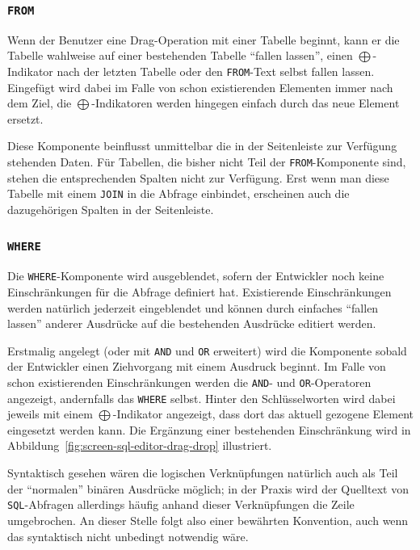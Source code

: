 \subsubsection{\texttt{FROM}}

Wenn der Benutzer eine Drag-Operation mit einer Tabelle beginnt, kann er die Tabelle wahlweise auf einer bestehenden Tabelle "`fallen lassen"', einen $\bigoplus$-Indikator nach der letzten Tabelle oder den \texttt{FROM}-Text selbst fallen lassen. Eingefügt wird dabei im Falle von schon existierenden Elementen immer nach dem Ziel, die $\bigoplus$-Indikatoren werden hingegen einfach durch das neue Element ersetzt.

Diese Komponente beinflusst unmittelbar die in der Seitenleiste zur Verfügung stehenden Daten. Für Tabellen, die bisher nicht Teil der \texttt{FROM}-Komponente sind, stehen die entsprechenden Spalten nicht zur Verfügung. Erst wenn man diese Tabelle mit einem \texttt{JOIN} in die Abfrage einbindet, erscheinen auch die dazugehörigen Spalten in der Seitenleiste.

\subsubsection{\texttt{WHERE}}

Die \texttt{WHERE}-Komponente wird ausgeblendet, sofern der Entwickler noch keine Einschränkungen für die Abfrage definiert hat. Existierende Einschränkungen werden natürlich jederzeit eingeblendet und können durch einfaches "`fallen lassen"' anderer Ausdrücke auf die bestehenden Ausdrücke editiert werden.

Erstmalig angelegt (oder mit \texttt{AND} und \texttt{OR} erweitert) wird die Komponente sobald der Entwickler einen Ziehvorgang mit einem Ausdruck beginnt. Im Falle von schon existierenden Einschränkungen werden die \texttt{AND}- und \texttt{OR}-Operatoren angezeigt, andernfalls das \texttt{WHERE} selbst. Hinter den Schlüsselworten wird dabei jeweils mit einem $\bigoplus$-Indikator angezeigt, dass dort das aktuell gezogene Element eingesetzt werden kann. Die Ergänzung einer bestehenden Einschränkung wird in Abbildung~\ref{fig:screen-sql-editor-drag-drop} illustriert.

Syntaktisch gesehen wären die logischen Verknüpfungen natürlich auch als Teil der "`normalen"' binären Ausdrücke möglich; in der Praxis wird der Quelltext von \texttt{SQL}-Abfragen allerdings häufig anhand dieser Verknüpfungen die Zeile umgebrochen. An dieser Stelle folgt \idename{} also einer bewährten Konvention, auch wenn das syntaktisch nicht unbedingt notwendig wäre.

